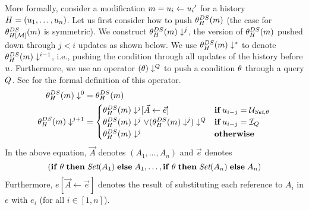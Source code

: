 More formally, consider a modification $m = u_i \gets {u_i}'$ for a history $H = (u_1, \ldots, u_n)$. Let us first consider how to push $\theta_{H}^{DS}(m)$ (the case for $\theta_{H[\mathcal{M}]}^{DS}(m)$ is symmetric).
We construct ${\theta_{H}^{DS}(m)}\downarrow^{j}$, the version of $\theta_{H}^{DS}(m)$ pushed down through $j < i$ updates as shown below. We use ${\theta_{H}^{DS}(m)}\downarrow^{\ast}$ to denote ${\theta_{H}^{DS}(m)}\downarrow^{i-1}$, i.e., pushing the condition through all updates of the history before $u$. Furthermore, we use an operator $(\theta)\downarrow^{Q}$  to push a condition $\theta$ through a query $Q$. See \cite{techreport} for the formal definition of this operator.
%
\begin{align*}
  {\theta_{H}^{DS}(m)}\downarrow^{0}                                                 & = \theta_{H}^{DS}(m)                            \\
  {\theta_{H}^{DS}(m)}\downarrow^{j+1}                                               & =
                                    \begin{cases}
                                      {{\theta_{H}^{DS}(m)}\downarrow^{j}}[\vec{A} \gets \vec{e}] & \mathbf{if}\, u_{i-j} = \mathcal{U}_{\textit{Set},\theta} \\
                                      {\theta_{H}^{DS}(m)}\downarrow^{j} \lor ({\theta_{H}^{DS}(m)}\downarrow^{j})\downarrow^{Q} &\mathbf{if}\, u_{i-j} = \mathcal{I}_{Q}\\
                                      {\theta_{H}^{DS}(m)}\downarrow^{j}             & \mathbf{otherwise}                           \\
                                    \end{cases}
\end{align*}
In the above equation, $\vec{A}$ denotes $(A_1, \ldots, A_n)$ and $\vec{e}$ denotes
%
\[
  (\mathbf{if}\thickspace \theta \thickspace \mathbf{then} \thickspace \textit{Set}(A_1) \thickspace \mathbf{else} \thickspace A_1,\ldots, \mathbf{if}\thickspace \theta \thickspace \mathbf{then} \thickspace \textit{Set}(A_n) \thickspace \mathbf{else} \thickspace A_n)
\]
Furthermore, $e[\vec{A} \gets \vec{e}]$ denotes the result of substituting each reference to $A_i$ in $e$ with $e_i$ (for all $i \in [1,n]$).

\iftechreport{

}

